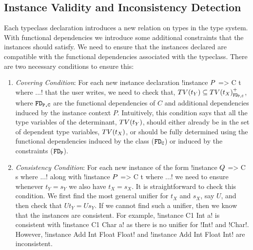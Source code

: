 \documentclass[format=acmsmall,manuscript,review,screen,nonacm,margin=1in,11pt]{acmart}
\begin{document}
\subsection{Instance Validity and Inconsistency Detection}
Each typeclass declaration introduces a new relation on types in the type system. With functional dependencies
we introduce some additional constraints that the instances should satisfy.
We need to ensure that the instances declared are compatible
with the functional dependencies associated with the typeclass.
There are two necessary conditions to ensure this:\vspace{-1em}
\begin{enumerate}[topsep={0pt},partopsep={0pt}]
\item\emph{Covering Condition}:  For each new instance declaration !instance $P$ => C t where ...!
  that the user writes, we need to check that,%
  $TV(t_Y) \subseteq {TV(t_X)}^{+}_{\texttt{FD}_\texttt{{P,C}}}$,
  where $\texttt{FD}_\texttt{{P,C}}$ are the functional dependencies of $C$ and additional dependencies
  induced by the instance context $P$. Intuitively, this condition says that
  all the type variables of the determinant, $TV(t_Y)$, should either already be in the
  set of dependent type variables, $TV(t_X)$, or should be fully determined using the
  functional dependencies induced by the class ($\texttt{FD}_\texttt{C}$) or induced by the constraints ($\texttt{FD}_\texttt{P}$).
\item\emph{Consistency Condition}: For each new instance of the form !instance $Q$ => C s where ...!
  along with !instance $P$ => C t where ...! we need to ensure whenever $t_Y = s_Y$ we also have $t_X = s_X$.
  It is straightforward to check this condition. We first find the most general unifier for $t_X$ and $s_X$,
  say $U$, and then check that $U t_Y = U s_Y$. If we cannot find such a unifier, then we know that
  the instances are consistent. For example, !instance C1 Int a! is consistent with !instance C1 Char a!
  as there is no unifier for !Int! and !Char!. However, !instance Add Int Float Float!
  and !instance Add Int Float Int! are inconsistent.%
\end{enumerate}
\end{document}
